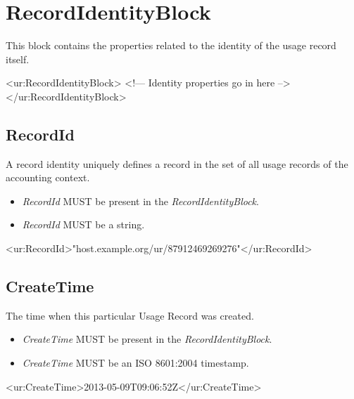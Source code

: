 
\section{RecordIdentityBlock}

This block contains the properties related to the identity of the usage record itself.

\begin{XMLexample}
<ur:RecordIdentityBlock>
<!— Identity properties go in here -->
</ur:RecordIdentityBlock>
\end{XMLexample}






\subsection{RecordId}

A record identity uniquely defines a record in the set of all usage records of the accounting context.
\begin{itemize}
\item \emph{RecordId} MUST be present in the \emph{RecordIdentityBlock}.
\item \emph{RecordId} MUST be a string.
\end{itemize}

\begin{XMLexample}
<ur:RecordId>"host.example.org/ur/87912469269276"</ur:RecordId>
\end{XMLexample}






\subsection{CreateTime}

The time when this particular Usage Record was created.
\begin{itemize}
\item \emph{CreateTime} MUST be present in the \emph{RecordIdentityBlock}.
\item \emph{CreateTime} MUST be an ISO 8601:2004 timestamp.
\end{itemize}

\begin{XMLexample}
<ur:CreateTime>2013-05-09T09:06:52Z</ur:CreateTime>
\end{XMLexample}



